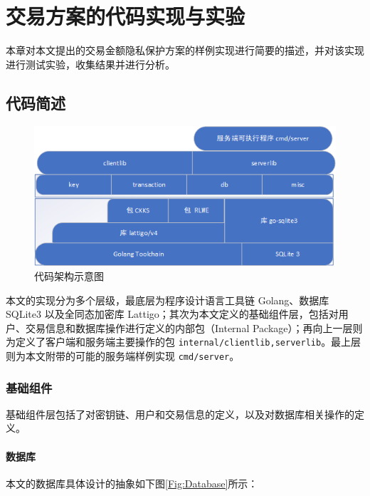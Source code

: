 \chapter{交易方案的代码实现与实验}

本章对本文提出的交易金额隐私保护方案的样例实现进行简要的描述，并对该实现进行测试实验，收集结果并进行分析。

\section{代码简述}

\begin{figure}[ht]
    \centering
    \includegraphics[width=0.8\linewidth]{Figures/abstract_on_chimata.png}
    \caption{代码架构示意图}\label{Fig:Design}
\end{figure}

本文的实现分为多个层级，最底层为程序设计语言工具链 Golang、数据库 SQLite3 以及全同态加密库 Lattigo；其次为本文定义的基础组件层，包括对用户、交易信息和数据库操作进行定义的内部包（Internal Package）；再向上一层则为定义了客户端和服务端主要操作的包 \verb|internal/clientlib,serverlib|。最上层则为本文附带的可能的服务端样例实现 \verb|cmd/server|。

\subsection{基础组件}

基础组件层包括了对密钥链、用户和交易信息的定义，以及对数据库相关操作的定义。

\subsubsection*{数据库}

本文的数据库具体设计的抽象如下图\ref*{Fig:Database}所示：

